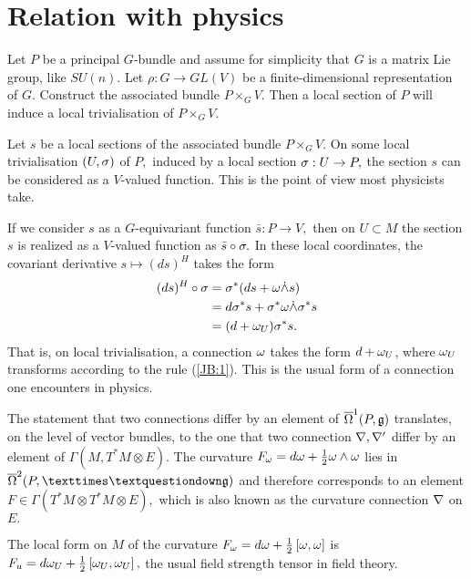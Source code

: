 \section{Relation with physics}

Let $P$ be a principal $G$-bundle and assume for simplicity that $G$ is a matrix Lie group, like $SU(n).$ Let $\rho: G
\to GL(V)$ be a finite-dimensional representation of $G.$ Construct the associated bundle $P \times_{G} V.$ Then a
local section of $P$ will induce a local trivialisation of $P \times_{G} V.$

Let $s$ be a local sections of the associated bundle $P \times_{G} V.$ On some local trivialisation $(U, \sigma)$ of $P,$
induced by a local section $\sigma:U \to P,$ the section $s$ can be considered as a $V$-valued function. This is the
point of view most physicists take.

If we consider $s$ as a $G$-equivariant function $\bar{s}:P \to V,$ then on $U \subset M$ the section $s$ is realized
as a $V$-valued function as $\bar{s}\circ \sigma.$ In these local coordinates, the covariant derivative $s \mapsto
(ds)^{H}$ takes the form
\begin{align*}
 (ds)^{H}\circ \sigma &= \sigma^{*}(ds + \omega \dot{\wedge} s) \\
&=d\sigma^{*}s + \sigma^{*}\omega \dot{\wedge} \sigma^{*}s \\
&= (d+\omega_{U})\sigma^{*}s.
\end{align*}
That is, on local trivialisation, a connection $\omega$ takes the form $d+\omega_{U}$, where $\omega_{U}$ transforms according
to the rule (\ref{JB:1}). This is the usual form of a connection one encounters in physics.

The statement that two connections differ by an element of $\overline{\Omega}^{1}(P, \mathfrak{g})$ translates, on the level of vector
bundles, to the one that two connection $\nabla, {\nabla}^{\prime}$ differ by an element of $\Gamma(M, T^{*}M\otimes E).$ The
curvature $F_{\omega}=d\omega + \frac{1}{2} \omega \wedge \omega$ lies in $\dfp{2}{×¿\mfk{g}}$ and therefore corresponds to an
element $F \in \Gamma(T^{*}M \otimes T^{*}M \otimes E),$ which is also known as the curvature connection $\nabla$ on $E.$

The local form on $M$ of the curvature $F_{\omega}=d\omega + \frac{1}{2}\left[\omega,\omega\right]$ is $F_{u}=d \omega_{U} +
\frac{1}{2}\left[\omega_{U},\omega_{U}\right],$ the usual field strength tensor in field theory.